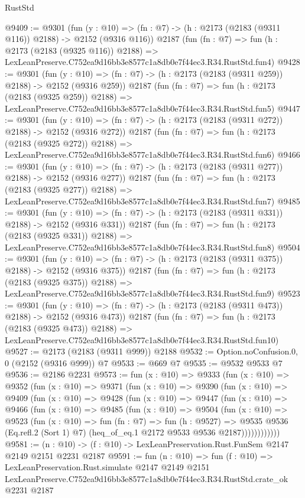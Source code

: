 \begin{lexlean}{RustStd}
\begin{coremodule}
@9409 := @9301
    (fun (y : @10) => (fn : @7) -> (h : @2173 (@2183 (@9311 @116)) @2188) -> @2152 (@9316 @116))
    @2187
    (fun (fn : @7) =>
    fun (h : @2173 (@2183 (@9325 @116)) @2188) =>
    LexLeanPreserve.C752ea9d16bb3e8577c1a8db0e7f44ec3.R34.RustStd.fun4)
@9428 := @9301
    (fun (y : @10) => (fn : @7) -> (h : @2173 (@2183 (@9311 @259)) @2188) -> @2152 (@9316 @259))
    @2187
    (fun (fn : @7) =>
    fun (h : @2173 (@2183 (@9325 @259)) @2188) =>
    LexLeanPreserve.C752ea9d16bb3e8577c1a8db0e7f44ec3.R34.RustStd.fun5)
@9447 := @9301
    (fun (y : @10) => (fn : @7) -> (h : @2173 (@2183 (@9311 @272)) @2188) -> @2152 (@9316 @272))
    @2187
    (fun (fn : @7) =>
    fun (h : @2173 (@2183 (@9325 @272)) @2188) =>
    LexLeanPreserve.C752ea9d16bb3e8577c1a8db0e7f44ec3.R34.RustStd.fun6)
@9466 := @9301
    (fun (y : @10) => (fn : @7) -> (h : @2173 (@2183 (@9311 @277)) @2188) -> @2152 (@9316 @277))
    @2187
    (fun (fn : @7) =>
    fun (h : @2173 (@2183 (@9325 @277)) @2188) =>
    LexLeanPreserve.C752ea9d16bb3e8577c1a8db0e7f44ec3.R34.RustStd.fun7)
@9485 := @9301
    (fun (y : @10) => (fn : @7) -> (h : @2173 (@2183 (@9311 @331)) @2188) -> @2152 (@9316 @331))
    @2187
    (fun (fn : @7) =>
    fun (h : @2173 (@2183 (@9325 @331)) @2188) =>
    LexLeanPreserve.C752ea9d16bb3e8577c1a8db0e7f44ec3.R34.RustStd.fun8)
@9504 := @9301
    (fun (y : @10) => (fn : @7) -> (h : @2173 (@2183 (@9311 @375)) @2188) -> @2152 (@9316 @375))
    @2187
    (fun (fn : @7) =>
    fun (h : @2173 (@2183 (@9325 @375)) @2188) =>
    LexLeanPreserve.C752ea9d16bb3e8577c1a8db0e7f44ec3.R34.RustStd.fun9)
@9523 := @9301
    (fun (y : @10) => (fn : @7) -> (h : @2173 (@2183 (@9311 @473)) @2188) -> @2152 (@9316 @473))
    @2187
    (fun (fn : @7) =>
    fun (h : @2173 (@2183 (@9325 @473)) @2188) =>
    LexLeanPreserve.C752ea9d16bb3e8577c1a8db0e7f44ec3.R34.RustStd.fun10)
@9527 := @2173 (@2183 (@9311 @999)) @2188
@9532 := Option.noConfusion.{0, 0} (@2152 (@9316 @999)) @7
@9533 := @669 @7
@9535 := @9532 @9533 @7
@9536 := @2186 @2231
@9573 := fun (x : @10) =>
  @9333
    (fun (x : @10) =>
    @9352
      (fun (x : @10) =>
      @9371
        (fun (x : @10) =>
        @9390
          (fun (x : @10) =>
          @9409
            (fun (x : @10) =>
            @9428
              (fun (x : @10) =>
              @9447
                (fun (x : @10) =>
                @9466
                  (fun (x : @10) =>
                  @9485
                    (fun (x : @10) =>
                    @9504
                      (fun (x : @10) =>
                      @9523
                        (fun (x : @10) =>
                        fun (fn : @7) =>
                        fun (h : @9527) =>
                        @9535
                          @9536
                          (Eq.refl.{2} (Sort 1) @7)
                          (heq_of_eq.{1} @2172 @9533 @9536 @2187))))))))))))
@9581 := (n : @10) -> (f : @10) -> LexLeanPreservation.Rust.FunSem @2147 @2149 @2151 @2231 @2187
@9591 := fun (n : @10) =>
  fun (f : @10) =>
  LexLeanPreservation.Rust.simulate
    @2147
    @2149
    @2151
    LexLeanPreserve.C752ea9d16bb3e8577c1a8db0e7f44ec3.R34.RustStd.crate_ok
    @2231
    @2187
\end{coremodule}
\end{lexlean}
